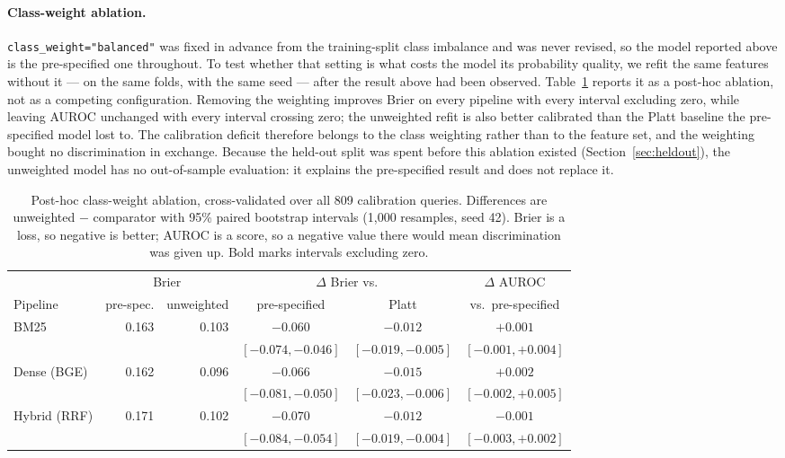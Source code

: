 \documentclass[11pt,a4paper]{article}
\begin{document}
\paragraph{Class-weight ablation.}
\texttt{class\_weight="balanced"} was fixed in advance from the training-split class imbalance and
was never revised, so the model reported above is the pre-specified one throughout. To test
whether that setting is what costs the model its probability quality, we refit the same features
without it --- on the same folds, with the same seed --- after the result above had been observed.
Table~\ref{tab:ablation} reports it as a post-hoc ablation, not as a competing configuration.
Removing the weighting improves Brier on every pipeline with every interval excluding zero, while
leaving AUROC unchanged with every interval crossing zero; the unweighted refit is also better
calibrated than the Platt baseline the pre-specified model lost to. The calibration deficit
therefore belongs to the class weighting rather than to the feature set, and the weighting bought
no discrimination in exchange. Because the held-out split was spent before this ablation existed
(Section~\ref{sec:heldout}), the unweighted model has no out-of-sample evaluation: it explains the
pre-specified result and does not replace it.

\begin{table}[tbp]
\centering
\footnotesize
\caption{Post-hoc class-weight ablation, cross-validated over all 809 calibration queries.
Differences are unweighted $-$ comparator with 95\% paired bootstrap intervals (1{,}000
resamples, seed 42). Brier is a loss, so negative is better; AUROC is a score, so a negative
value there would mean discrimination was given up. Bold marks intervals excluding zero.}
\label{tab:ablation}
\begin{tabular}{lrrccc}
\toprule
 & \multicolumn{2}{c}{Brier} & \multicolumn{2}{c}{$\Delta$ Brier vs.} & $\Delta$ AUROC \\
\cmidrule(lr){2-3}\cmidrule(lr){4-5}\cmidrule(lr){6-6}
Pipeline & pre-spec. & unweighted & pre-specified & Platt & vs.\ pre-specified \\
\midrule
BM25         & 0.163 & 0.103 & $\mathbf{-0.060}$ & $\mathbf{-0.012}$ & $+0.001$ \\
             &       &       & $\mathbf{[-0.074, -0.046]}$ & $\mathbf{[-0.019, -0.005]}$ & $[-0.001, +0.004]$ \\
Dense (BGE)  & 0.162 & 0.096 & $\mathbf{-0.066}$ & $\mathbf{-0.015}$ & $+0.002$ \\
             &       &       & $\mathbf{[-0.081, -0.050]}$ & $\mathbf{[-0.023, -0.006]}$ & $[-0.002, +0.005]$ \\
Hybrid (RRF) & 0.171 & 0.102 & $\mathbf{-0.070}$ & $\mathbf{-0.012}$ & $-0.001$ \\
             &       &       & $\mathbf{[-0.084, -0.054]}$ & $\mathbf{[-0.019, -0.004]}$ & $[-0.003, +0.002]$ \\
\bottomrule
\end{tabular}
\end{table}
\end{document}

